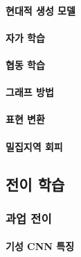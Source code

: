 \documentclass [12pt] {oblivoir}
\let\oldsubsubsection=\subsubsection
\renewcommand{\subsubsection}
{
  \filbreak
  \oldsubsubsection
}
\begin{document}
\vspace{3mm}

\paragraph*{현대적 생성 모델}\mbox{}

\vspace{3mm}

\paragraph*{자가 학습}\mbox{}

\vspace{3mm}

\paragraph*{협동 학습}\mbox{}

\vspace{3mm}

\paragraph*{그래프 방법}\mbox{}

\vspace{3mm}

\paragraph*{표현 변환}\mbox{}

\vspace{3mm}

\paragraph*{밀집지역 회피}\mbox{}

\vspace{3mm}

\subsection{전이 학습}

\subsubsection{과업 전이}

\paragraph*{기성 CNN 특징}\mbox{}
\end{document}
